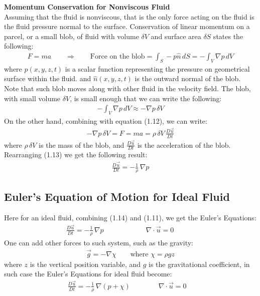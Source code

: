 \documentclass[11pt]{book}
\theoremstyle{break}
\theoremstyle{break}
\begin{document}
\textbf{Momentum Conservation for Nonviscous Fluid}\\
Assuming that the fluid is nonviscous, that is the only force acting on the fluid is the fluid pressure normal to the surface. Conservation of linear momentum on a parcel, or a small blob, of fluid with volume $\delta V$ and surface area $\delta S$ states the following:
\begin{align}
F = ma \qquad \Rightarrow \qquad \text{Force on the blob} = \int_S -p \hat{n}\, dS = -\int_V \nabla p\, dV
\end{align}
where $p(x,y,z,t)$ is a scalar function representing the pressure on geometrical surface within the fluid. and $\hat{n}(x,y,z,t)$ is the outward normal of the blob. Note that such blob moves along with other fluid in the velocity field. The blob, with small volume $\delta V$, is small enough that we can write the following:
\begin{align*}
-\int_V \nabla p \, dV \approx -\nabla p \, \delta V
\end{align*}
On the other hand, combining with equation (1.12), we can write:
\begin{align}
-\nabla p\, \delta V = F = ma = \rho\, \delta V \, \frac{D\vec{u}}{Dt} 
\end{align}
where $\rho \, \delta V$ is the mass of the blob, and $\frac{D\vec{u}}{Dt}$ is the acceleration of the blob. Rearranging (1.13) we get the following result:
\begin{align}
\frac{D\vec{u}}{Dt} = -\frac{1}{\rho}\, \nabla p
\end{align}
\hfill\break


\subsection*{Euler's Equation of Motion for Ideal Fluid}
Here for an ideal fluid, combining (1.14) and (1.11), we get the Euler's Equations:
\begin{align*}
\frac{D\vec{u}}{Dt} = -\frac{1}{\rho}\, \nabla p \qquad\qquad\qquad \nabla \cdot \vec{u} = 0 \qquad\quad \tag{Euler's Equations}
\end{align*}
One can add other forces to such system, such as the gravity:
\begin{align*}
\vec{g} = -\nabla \chi \qquad \text{where } \chi = \rho g z
\end{align*}
where $z$ is the vertical position variable, and $g$ is the gravitational coefficient, in such case the Euler's Equations for ideal fluid become:
\begin{align*}
\frac{D\vec{u}}{Dt} = -\frac{1}{\rho}\, \nabla (p+\chi) \qquad\qquad \nabla \cdot \vec{u} = 0 \quad \tag{Euler's Equations under Gravity}
\end{align*}
\newpage
\end{document}

